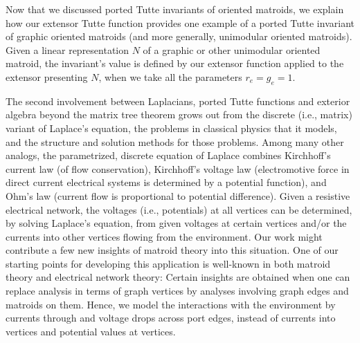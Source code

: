 \documentclass[12pt]{article}
\theoremstyle{definition}
\begin{document}
Now that we discussed ported Tutte invariants of oriented matroids, we
explain how our extensor Tutte function provides one 
example of a ported Tutte invariant of graphic oriented matroids (and more
generally, unimodular oriented matroids).  Given a linear representation $N$
of a graphic or other unimodular oriented matroid, the invariant's value
is defined by our extensor function applied to the extensor presenting
$N$, when we take all the parameters $r_e=g_e=1$.  

The second involvement between Laplacians, ported Tutte functions and exterior
algebra beyond the matrix tree theorem grows out from the discrete (i.e., matrix)
variant of Laplace's equation, the problems in classical physics that it
models, and the structure and solution methods for those problems.
Among many other analogs, the parametrized, discrete equation 
of Laplace combines Kirchhoff's current law (of flow conservation),  Kirchhoff's 
voltage law (electromotive force 
in direct current electrical systems is determined by a potential function),
and Ohm's law (current flow is proportional to potential difference).  
Given a resistive electrical network, the voltages (i.e., potentials)
at all vertices can be determined, by solving Laplace's equation, 
from given voltages at certain vertices and/or the currents into 
other vertices flowing from the environment.
Our work might contribute a few new insights of matroid theory into this 
situation.  One of our starting points for developing this application
is well-known in both matroid theory and electrical network theory:
Certain insights are obtained when one can replace analysis in terms
of graph vertices by analyses involving graph edges and matroids on
them.  Hence, we model the interactions with the environment
by currents through and voltage drops across port edges, instead of
currents into vertices and potential values at vertices.
\end{document}
